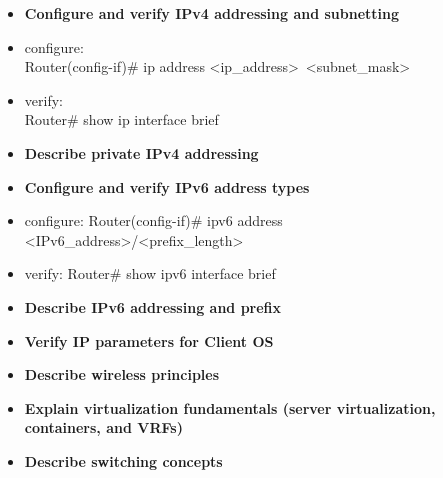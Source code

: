 \documentclass{article}
\begin{document}
\begin{itemize}
  \item \textbf{Configure and verify IPv4 addressing and subnetting}
  	\item[] configure:\\
  	Router(config-if)\# ip address \textless ip\_address\textgreater\ \textless subnet\_mask\textgreater
  	\item[] verify:\\
  	Router\# show ip interface brief
  \item \textbf{Describe private IPv4 addressing}
  \item \textbf{Configure and verify IPv6 address types}
  	\item[] configure:
  	Router(config-if)\# ipv6 address \textless IPv6\_address\textgreater/\textless prefix\_length\textgreater
  	\item[] verify:
  	Router\# show ipv6 interface brief
  \item \textbf{Describe IPv6 addressing and prefix}
  \item \textbf{Verify IP parameters for Client OS}
  \item \textbf{Describe wireless principles}
  \item \textbf{Explain virtualization fundamentals (server virtualization, containers, and VRFs)}
  \item \textbf{Describe switching concepts}
\end{itemize}
\end{document}
